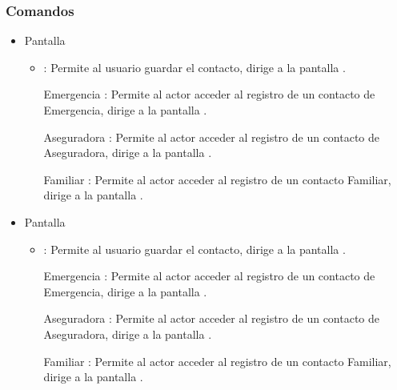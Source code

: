    

\subsubsection{Comandos}
    \begin{itemize}
    	
    	\item Pantalla 
    	
    	\begin{itemize}
    		\item {}: Permite al usuario guardar el contacto, dirige a la pantalla .
            \item [Emergencia]: Permite al actor acceder al registro de un contacto de Emergencia, dirige a la pantalla .
            \item [Aseguradora]: Permite al actor acceder al registro de un contacto de Aseguradora, dirige a la pantalla .
            \item [Familiar]: Permite al actor acceder al registro de un contacto Familiar, dirige a la pantalla .
    	\end{itemize}
    
		\item Pantalla 
		
		\begin{itemize}
			\item {}: Permite al usuario guardar el contacto, dirige a la pantalla .
            \item [Emergencia]: Permite al actor acceder al registro de un contacto de Emergencia, dirige a la pantalla .
            \item [Aseguradora]: Permite al actor acceder al registro de un contacto de Aseguradora, dirige a la pantalla .
            \item [Familiar]: Permite al actor acceder al registro de un contacto Familiar, dirige a la pantalla . 
		\end{itemize}


\end{itemize}
